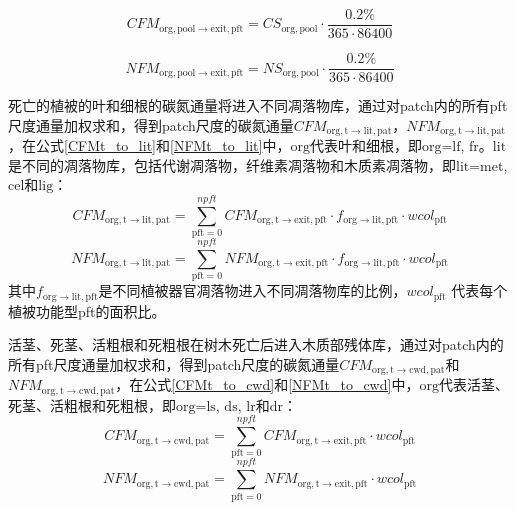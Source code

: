 \begin{equation}\label{CFMexit}
  CFM_{\mathrm{org,pool\rightarrow exit,pft}}=CS_{\mathrm{org,pool}}\cdot \frac{0.2\%}{365\cdot 86400}
\end{equation}

\begin{equation}\label{NFMexit}
  NFM_{\mathrm{org,pool\rightarrow exit,pft}}=NS_{\mathrm{org,pool}}\cdot \frac{0.2\%}{365\cdot 86400}
\end{equation}

死亡的植被的叶和细根的碳氮通量将进入不同凋落物库，通过对patch内的所有pft尺度通量加权求和，得到patch尺度的碳氮通量$CFM_{\mathrm{org,t\rightarrow lit,pat}}$，$NFM_{\mathrm{org,t\rightarrow lit,pat}}$，在公式\eqref{CFMt_to_lit}和\eqref{NFMt_to_lit}中，${\mathrm {org}}$代表叶和细根，即$\text{org=lf}$, ${\mathrm {fr}}$。${\mathrm {lit}}$是不同的凋落物库，包括代谢凋落物，纤维素凋落物和木质素凋落物，即$\text{lit=met}$, ${\mathrm {cel}}$和${\mathrm {lig}}$：
\begin{equation}\label{CFMt_to_lit}
  CFM_{\mathrm{org,t\rightarrow lit,pat}}=\sum_{\mathrm{pft=0}}^{npft}{CFM_{\mathrm{org,t\rightarrow exit,pft}}\cdot f_{\mathrm{{org}\rightarrow lit,pft}}\cdot{wcol_{\mathrm{pft}}}}
\end{equation}
\begin{equation}\label{NFMt_to_lit}
  NFM_{\mathrm{org,t\rightarrow lit,pat}}=\sum_{\mathrm{pft=0}}^{npft}{NFM_{\mathrm{org,t\rightarrow exit,pft}}\cdot f_{\mathrm{{org}\rightarrow lit,pft}}\cdot{wcol_{\mathrm{pft}}}}
\end{equation}
其中$f_{\mathrm{org\rightarrow lit,pft}}$是不同植被器官凋落物进入不同凋落物库的比例，${wcol_{\mathrm{pft}}}$ 代表每个植被功能型pft的面积比。


活茎、死茎、活粗根和死粗根在树木死亡后进入木质部残体库，通过对patch内的所有pft尺度通量加权求和，得到patch尺度的碳氮通量$CFM_{\mathrm{org,t\rightarrow cwd,pat}}$和$NFM_{\mathrm{org,t\rightarrow cwd,pat}}$，在公式\eqref{CFMt_to_cwd}和\eqref{NFMt_to_cwd}中，${\mathrm {org}}$代表活茎、死茎、活粗根和死粗根，即$\text{org=ls}$, ${\mathrm {ds}}$, ${\mathrm {lr}}$和${\mathrm {dr}}$：
\begin{equation}\label{CFMt_to_cwd}
  CFM_{\mathrm{org,t\rightarrow cwd,pat}}=\sum_{\mathrm{pft=0}}^{npft}{CFM_{\mathrm{org,t\rightarrow exit,pft}}\cdot {wcol_{\mathrm{pft}}}}
\end{equation}
\begin{equation}\label{NFMt_to_cwd}
  NFM_{\mathrm{org,t\rightarrow cwd,pat}}=\sum_{\mathrm{pft=0}}^{npft}{NFM_{\mathrm{org,t\rightarrow exit,pft}}\cdot {wcol_{\mathrm{pft}}}}
\end{equation}

